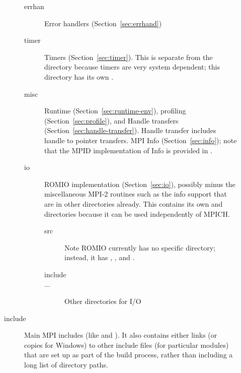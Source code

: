 \documentclass{article}
\begin{document}
\begin{description}
\begin{description}
\begin{description}
    \item[errhan]Error handlers (Section~\ref{sec:errhand})
    \item[timer]Timers (Section~\ref{sec:timer}).  This is separate from the
       directory because timers are very system dependent; this
      directory has its own .
    \item[misc]Runtime (Section~\ref{sec:runtime-env}), profiling
      (Section~\ref{sec:profile}), and Handle transfers
      (Section~\ref{sec:handle-transfer}).  Handle transfer includes handle to
      pointer transfers. MPI Info (Section~\ref{sec:info}); note that
      the MPID implementation of Info is provided in .
    \item[io]ROMIO implementation (Section~\ref{sec:io}), possibly
      minus the miscellaneous MPI-2 
      routines such as the info support that are in other directories already.
      This contains its own  and  directories
      because it can be used independently of MPICH.
      \begin{description}
      \item[src]Note ROMIO currently has no specific  directory;
        instead, it has , , and .
      \item[include]
      \item[...]Other directories for I/O
      \end{description}
    \end{description}
\item[include]Main MPI includes (like  and ).  
  It also contains either links (or copies for Windows) to 
  other include files (for particular modules) that are set up as part of
  the build process, rather than including a long list of directory paths.

\end{description}
\end{description}
\end{document}

